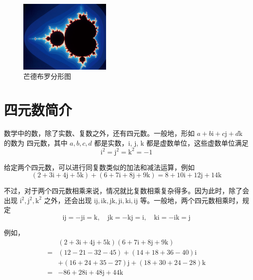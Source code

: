 \documentclass[a4paper,openany]{ctexbook}
\begin{document}
\begin{figure}
    \centering
    \includegraphics[width=0.4\textwidth]{image6.png}
    \caption{芒德布罗分形图}\label{fgr:mhdebuloffxktu}
\end{figure}

\section{四元数简介}

数学中的数，除了实数、复数之外，还有四元数。一般地，形如 \( a + b\mathrm{i} + c\mathrm{j} + d\mathrm{k} \) 的数为
四元数，其中 \( a, b, c, d \) 都是实数，$\mathrm{i}$, $\mathrm{j}$, $\mathrm{k}$ 都是虚数单位，这些虚数单位满足
\[ \mathrm{i}^2 = \mathrm{j}^2 = \mathrm{k}^2 = -1 \]

给定两个四元数，可以进行同复数类似的加法和减法运算，例如
\[ (2 + 3\mathrm{i} + 4\mathrm{j} + 5\mathrm{k}) + (6 + 7\mathrm{i} + 8\mathrm{j} + 9\mathrm{k}) = 8 + 10\mathrm{i} + 12\mathrm{j} + 14\mathrm{k}\]

不过，对于两个四元数相乘来说，情况就比复数相乘复杂得多。因为此时，除了会出现 \( \mathrm{i}^2, \mathrm{j}^2,
\mathrm{k}^2 \) 之外，还会出现 \( \mathrm{i}\mathrm{j}, \mathrm{i}\mathrm{k}, \mathrm{j}\mathrm{k},
\mathrm{j}\mathrm{i}, \mathrm{k}\mathrm{i}, \mathrm{i}\mathrm{j} \) 等。一般地，两个四元数相乘时，规定
\[
    \mathrm{i}\mathrm{j} = -\mathrm{j}\mathrm{i} = \mathrm{k},
    \quad
    \mathrm{j}\mathrm{k} = -\mathrm{k}\mathrm{j} = \mathrm{i},
    \quad
    \mathrm{k}\mathrm{i} = -\mathrm{i}\mathrm{k} = \mathrm{j}
\]

例如，
\begin{align*}
      & (2 + 3\mathrm{i} + 4\mathrm{j} + 5\mathrm{k})(6 + 7\mathrm{i} + 8\mathrm{j} + 9\mathrm{k}) \\
    = & (12 - 21 - 32 - 45) +(14 + 18 + 36 - 40)\mathrm{i}                                         \\
      & +(16 + 24 + 35 - 27)\mathrm{j} +(18 + 30 + 24 - 28)\mathrm{k}                              \\
    = & -86 + 28\mathrm{i} + 48\mathrm{j} + 44\mathrm{k}
\end{align*}
\end{document}
